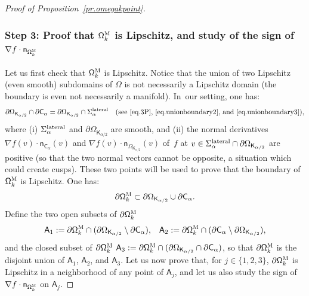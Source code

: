 \documentclass[JEP,XML,SOM,Unicode,NoEqCountersInSection,NoFloatCountersInSection,published]{cedram}
\let\pa\partial
\theoremstyle{plain}
\theoremstyle{definition}
\begin{document}
\begin{proof}[Proof of Proposition~\ref{pr.omegakpoint}]
\subsubsection*{Step 3: Proof that $\mathsf \Omega_k^{\textsc{M}}$ is
Lipschitz, and study of the sign of $\nabla f\cdot \mathsf n _{\mathsf \Omega_k^{\textsc{M}}}$}
Let us first check that $\mathsf \Omega_k^{\textsc{M}}$ is
Lipschitz. Notice that the union of two Lipschitz (even smooth)
subdomains of $\Omega$ is not necessarily a Lipschitz domain (the
boundary is even not necessarily a manifold). In~our setting, one has:
\[
\partial \Omega_{\mathsf K_{\alpha/2}}\cap \pa \mathsf
C_\alpha=\partial \Omega_{\mathsf K_{\alpha/2}} \cap
\Sigma_\alpha^{\textup{lateral}} \quad\text{(see~\eqref{eq.3P},~\eqref{eq.unionboundary2},
and~\eqref{eq.unionboundary3})},
\]
where (i) $\Sigma_\alpha^{\textup{lateral}}$ and $\partial \Omega_{\mathsf K_{\alpha/2}}$ are smooth, and (ii) the normal derivatives $\nabla f(v)\cdot \mathsf n_{\mathsf C_\alpha}(v)$ and $\nabla f(v)\cdot \mathsf n_{ \Omega_{\mathsf K_{\alpha/2}}}(v)$ of~$f$ at $v\in \Sigma_\alpha^{\textup{lateral}}\cap \partial \Omega_{\mathsf K_{\alpha/2}}$ are positive (so that the two normal vectors cannot be opposite, a situation which could create cusps). These two points will be used to prove that the boundary of $\mathsf \Omega_k^{\textsc{M}}$ is Lipschitz.
One has:
\begin{equation}\label{eq.=pa-domk-union}
\pa \mathsf \Omega_k^{\textsc{M}} \subset \partial \Omega_{\mathsf K_{\alpha/2}} \cup \pa \mathsf C_\alpha.
\end{equation}
Define the two open subsets of $\pa \mathsf \Omega_k^{\textsc{M}}$
\begin{equation}\label{eq.A1A2}
\mathsf A_1:=\pa \mathsf \Omega_k^{\textsc{M}} \cap (\partial \Omega_{\mathsf K_{\alpha/2}}\setminus \pa \mathsf C_\alpha), \ \ \, \mathsf A_2:= \pa \mathsf \Omega_k^{\textsc{M}}\cap (\pa \mathsf C_\alpha\setminus\partial \Omega_{\mathsf K_{\alpha/2}}),
\end{equation}
and the closed subset of $\pa \mathsf \Omega_k^{\textsc{M}}$
$\mathsf A_3:= \pa \mathsf \Omega_k^{\textsc{M}} \cap (\partial \Omega_{\mathsf K_{\alpha/2}}\cap \pa \mathsf C_\alpha)$,
so that $\pa \mathsf \Omega_k^{\textsc{M}}$ is the disjoint union of
$\mathsf A_1$, $\mathsf A_2$, and $\mathsf A_3$. Let us now prove
that, for $j\in \{1,2,3\}$, $\pa \mathsf \Omega_k^{\textsc{M}}$ is
Lipschitz in a neighborhood of any point of $\mathsf A_j$, and let us
also study the sign of $\nabla f\cdot \mathsf n_{ \mathsf
\Omega_k^{\textsc{M}}}$ on $\mathsf A_j$.


\end{proof}
\end{document}
